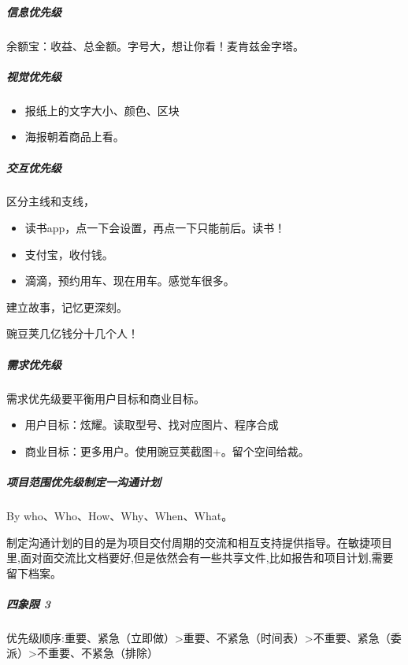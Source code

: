 \documentclass[letterpaper,10pt,english]{sphinxmanual}
\begin{document}
\subparagraph{信息优先级}
\label{\detokenize{chapter_knowledge/demand_analysis:id10}}
余额宝：收益、总金额。字号大，想让你看！麦肯兹金字塔。


\subparagraph{视觉优先级}
\label{\detokenize{chapter_knowledge/demand_analysis:id11}}\begin{itemize}
\item {} 
报纸上的文字大小、颜色、区块

\item {} 
海报朝着商品上看。

\end{itemize}


\subparagraph{交互优先级}
\label{\detokenize{chapter_knowledge/demand_analysis:id12}}
区分主线和支线，
\begin{itemize}
\item {} 
读书app，点一下会设置，再点一下只能前后。读书！

\item {} 
支付宝，收付钱。

\item {} 
滴滴，预约用车、现在用车。感觉车很多。

\end{itemize}

建立故事，记忆更深刻。

豌豆荚几亿钱分十几个人！


\subparagraph{需求优先级}
\label{\detokenize{chapter_knowledge/demand_analysis:id13}}
需求优先级要平衡用户目标和商业目标。
\begin{itemize}
\item {} 
用户目标：炫耀。读取型号、找对应图片、程序合成

\item {} 
商业目标：更多用户。使用豌豆荚截图+。留个空间给裁。

\end{itemize}


\subparagraph{项目范围优先级制定一沟通计划}
\label{\detokenize{chapter_knowledge/demand_analysis:id14}}
By who、Who、How、Why、When、What。

制定沟通计划的目的是为项目交付周期的交流和相互支持提供指导。在敏捷项目里,面对面交流比文档要好,但是依然会有一些共享文件,比如报告和项目计划,需要留下档案。


\subparagraph{四象限 3\sphinxfootnotemark[545]}
\label{\detokenize{chapter_knowledge/demand_analysis:id15}}%
\begin{footnotetext}[545]\sphinxAtStartFootnote
{}
%
\end{footnotetext}\ignorespaces 
优先级顺序:重要、紧急（立即做）>重要、不紧急（时间表）>不重要、紧急（委派）>不重要、不紧急（排除）
\end{document}
